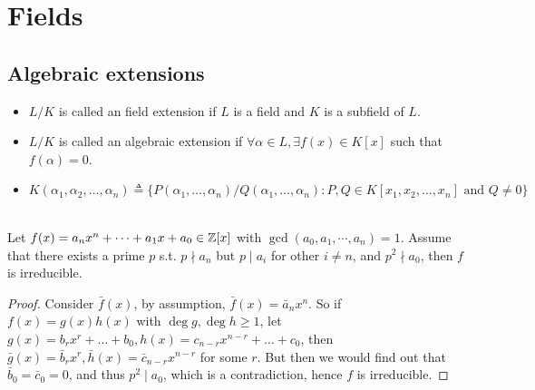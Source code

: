 \section{Fields}

\subsection{Algebraic extensions}

\begin{definition} \hfill
  \begin{itemize}
    \item $L / K$ is called an field extension if $L$ is a field and $K$ is a subfield of $L$.
    \item $L / K$ is called an algebraic extension if $\forall \alpha \in L, \exists f(x) \in K[x]$
      such that $f(\alpha) = 0$.
    \item $K(\alpha_1, \alpha_2, \dots, \alpha_n) \triangleq \big\{ P(\alpha_1, \dots, \alpha_n)
      / Q(\alpha_1, \dots, \alpha_n) : P, Q \in K[x_1, x_2, \dots, x_n] \text{ and } Q \neq 0 \big\}$
  \end{itemize}
\end{definition}

\begin{theorem} \mbox{} \\
  Let $f(x) = a_n x^n + \dots + a_1 x + a_0 \in \mathbb{Z}[x]$ with $\gcd(a_0, a_1, \cdots, a_n) = 1$.
  Assume that there exists a prime $p$ s.t. $p \nmid a_n$ but $p \mid a_i$ for other $i \neq n$,
  and $p^2 \nmid a_0$, then $f$ is irreducible.

  \begin{proof}
    Consider $\bar{f}(x)$, by assumption, $\bar{f}(x) = \bar{a}_n x^n$. So if $f(x) = g(x) h(x)$
    with $\deg g, \deg h \geq 1$, let $g(x) = b_r x^r + \dots + b_0, h(x) = c_{n-r} x^{n-r} + \dots + c_0$,
    then $\bar{g}(x) = \bar{b}_r x^r, \bar{h}(x) = \bar{c}_{n-r} x^{n-r}$ for some
    $r$. But then we would find out that $\bar{b}_0 = \bar{c}_0 = 0$, and thus $p^2 \mid a_0$,
    which is a contradiction, hence $f$ is irreducible.
  \end{proof}
\end{theorem}

